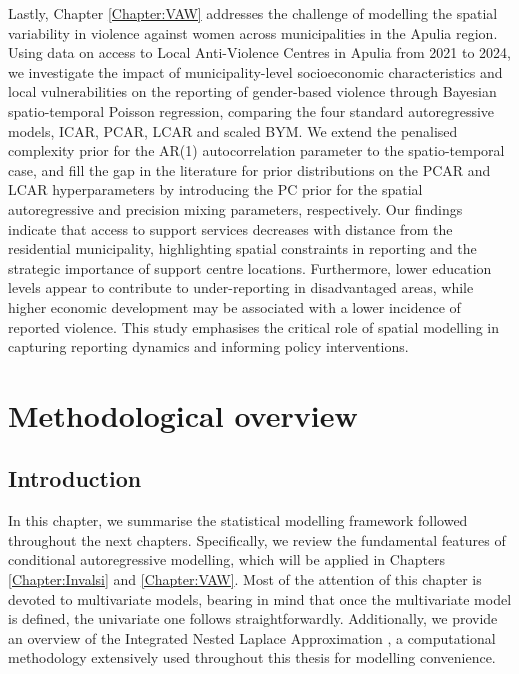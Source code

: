 \documentclass[openany, 11pt, oneside]{book}
\begin{document}
Lastly, Chapter \ref{Chapter:VAW} addresses the challenge of modelling the spatial variability in violence against women across municipalities in the Apulia region. Using data on access to Local Anti-Violence Centres in Apulia from 2021 to 2024, we investigate the impact of municipality-level socioeconomic characteristics and local vulnerabilities on the reporting of gender-based violence through Bayesian spatio-temporal Poisson regression, comparing the four standard autoregressive models, ICAR, PCAR, LCAR and scaled BYM. We extend the penalised complexity prior for the AR(1) autocorrelation parameter \parencite{Sorbye2017} to the spatio-temporal case, and fill the gap in the literature for prior distributions on the PCAR and LCAR hyperparameters by introducing the PC prior for the spatial autoregressive and precision mixing parameters, respectively. Our findings indicate that access to support services decreases with distance from the residential municipality, highlighting spatial constraints in reporting and the strategic importance of support centre locations. Furthermore, lower education levels appear to contribute to under-reporting in disadvantaged areas, while higher economic development may be associated with a lower incidence of reported violence. This study emphasises the critical role of spatial modelling in capturing reporting dynamics and informing policy interventions.
%
% 
%
%

\chapter{Methodological overview} \label{chapter:theory}
\section{Introduction}

In this chapter, we summarise the statistical modelling framework followed throughout the next chapters. Specifically, we review the fundamental features of conditional autoregressive modelling, which will be applied in Chapters \ref{Chapter:Invalsi} and \ref{Chapter:VAW}. Most of the attention of this chapter is devoted to multivariate models, bearing in mind that once the multivariate model is defined, the univariate one follows straightforwardly. Additionally, we provide an overview of the Integrated Nested Laplace Approximation \parencite[][INLA hereinafter]{INLA, VBINLA2023}, a computational methodology extensively used throughout this thesis for modelling convenience.
\end{document}

